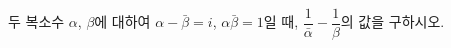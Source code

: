 두 복소수 $\alpha$, $\beta$에 대하여 $\alpha-\bar{\beta}=i$, $\alpha\bar{\beta}=1$일 때, $\dfrac{1}{\bar{\alpha}}-\dfrac{1}{\beta}$의 값을 구하시오. 
